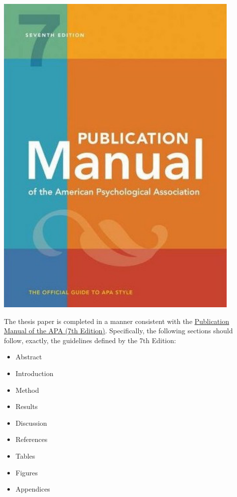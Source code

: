 \documentclass[openany]{book}
\providecommand{\tightlist}{%
  \setlength{\itemsep}{0pt}\setlength{\parskip}{0pt}}
\begin{document}
\includegraphics[width=4.72in]{images/apamanual}

The thesis paper is completed in a manner consistent with the \href{https://www.amazon.com/s?k=apa+publication+manual+7th+edition\&crid=7T10VJ2PYQZH\&sprefix=apa+pu\%2Caps\%2C261\&ref=nb_sb_ss_i_1_6}{Publication Manual of the APA (7th Edition)}. Specifically, the following sections should follow, exactly, the guidelines defined by the 7th Edition:

\begin{itemize}
\tightlist
\item
  Abstract
\item
  Introduction
\item
  Method
\item
  Results
\item
  Discussion
\item
  References
\item
  Tables
\item
  Figures
\item
  Appendices
\end{itemize}
\end{document}
